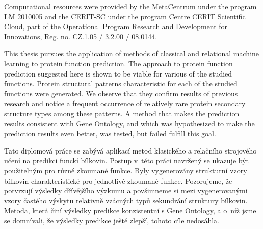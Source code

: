 \documentclass[11pt,twoside,a4paper]{book}
\begin{document}
\noindent
Computational resources were provided by the MetaCentrum under the program LM 2010005 and the CERIT-SC under the program Centre CERIT Scientific Cloud, part of the Operational Program Research and Development for Innovations, Reg. no. CZ.1.05 / 3.2.00 / 08.0144.





 
\abstractpage

This thesis pursues the application of methods of classical and relational machine learning
to protein function prediction.
The approach to protein function prediction suggested here is shown to be viable
for various of the studied functions.
Protein structural patterns characteristic for each of the studied functions
were generated. 
We observe that they confirm results of previous research
and notice a frequent occurrence of relatively rare protein secondary structure types among these patterns.
A method that makes the prediction results consistent with Gene Ontology, and which was hypothesized
to make the prediction results even better, was tested, but failed fulfill this goal.

\baselineskip

\noindent
Tato diplomová práce se zabývá aplikací metod klasického a relačního strojového učení
na predikci funckí bílkovin.
Postup v~této práci navržený se ukazuje být použitelným pro různé zkoumané funkce.
Byly vygenerovány strukturní vzory bílkovin charakteristické pro 
jednotlivé zkoumané funkce.
Pozorujeme, že potvrzují výsledky dřívějšího výzkumu
a povšimneme si mezi vygenerovanými vzory častého výskytu relativně vzácných typů sekundrání struktury bílkovin.
Metoda, která činí výsledky predikce konzistentní s Gene Ontology, 
a o~níž jsme se domnívali, že výsledky predikce ještě zlepší, tohoto cíle nedosáhla.


\tableofcontents



\listoffigures


\end{document}
